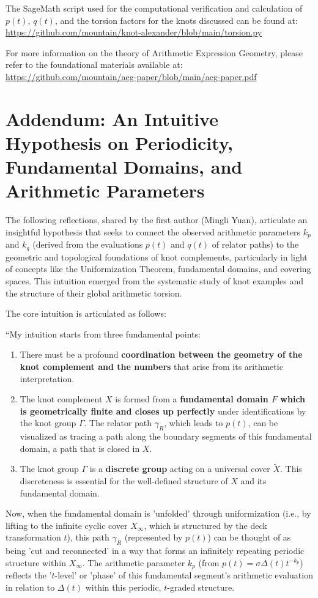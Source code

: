 \documentclass{article}[a4paper,12pt]
\begin{document}
The SageMath script used for the computational verification and calculation of $p(t)$, $q(t)$, and the torsion factors for the knots discussed can be found at:
\url{https://github.com/mountain/knot-alexander/blob/main/torsion.py}

For more information on the theory of Arithmetic Expression Geometry, please refer to the foundational materials available at:
\url{https://github.com/mountain/aeg-paper/blob/main/aeg-paper.pdf}

\newpage

\section*{Addendum: An Intuitive Hypothesis on Periodicity, Fundamental Domains, and Arithmetic Parameters}

The following reflections, shared by the first author (Mingli Yuan), articulate an insightful hypothesis that seeks to connect the observed arithmetic parameters $k_p$ and $k_q$ (derived from the evaluations $p(t)$ and $q(t)$ of relator paths) to the geometric and topological foundations of knot complements, particularly in light of concepts like the Uniformization Theorem, fundamental domains, and covering spaces. This intuition emerged from the systematic study of knot examples and the structure of their global arithmetic torsion.

The core intuition is articulated as follows:

``My intuition starts from three fundamental points:
\begin{enumerate}
    \item There must be a profound \textbf{coordination between the geometry of the knot complement and the numbers} that arise from its arithmetic interpretation.
    \item The knot complement $X$ is formed from a \textbf{fundamental domain $F$ which is geometrically finite and closes up perfectly} under identifications by the knot group $\Gamma$. The relator path $\gamma_R$, which leads to $p(t)$, can be visualized as tracing a path along the boundary segments of this fundamental domain, a path that is closed in $X$.
    \item The knot group $\Gamma$ is a \textbf{discrete group} acting on a universal cover $\tilde{X}$. This discreteness is essential for the well-defined structure of $X$ and its fundamental domain.
\end{enumerate}

Now, when the fundamental domain is 'unfolded' through uniformization (i.e., by lifting to the infinite cyclic cover $X_\infty$, which is structured by the deck transformation $t$), this path $\gamma_R$ (represented by $p(t)$) can be thought of as being 'cut and reconnected' in a way that forms an infinitely repeating periodic structure within $X_\infty$. The arithmetic parameter $k_p$ (from $p(t) = \sigma \Delta(t)t^{-k_p}$) reflects the '$t$-level' or 'phase' of this fundamental segment's arithmetic evaluation in relation to $\Delta(t)$ within this periodic, $t$-graded structure.
\end{document}
